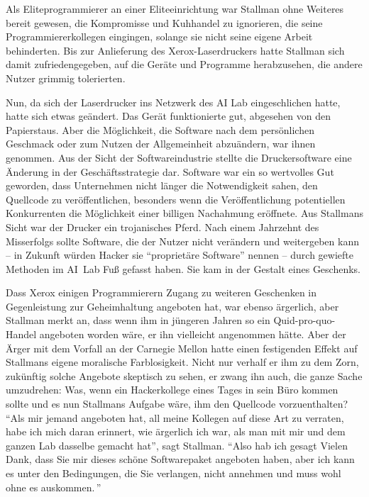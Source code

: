 Als Eliteprogrammierer an einer Eliteeinrichtung war Stallman ohne Weiteres bereit gewesen, die Kompromisse und Kuhhandel zu ignorieren, die seine Programmiererkollegen eingingen, solange sie nicht seine eigene Arbeit behinderten. Bis zur Anlieferung des Xerox-Laserdruckers hatte Stallman sich damit zufriedengegeben, auf die Geräte und Programme herabzusehen, die andere Nutzer grimmig tolerierten.

Nun, da sich der Laserdrucker ins Netzwerk des AI Lab eingeschlichen hatte, hatte sich etwas geändert. Das Gerät funktionierte gut, abgesehen von den Papierstaus. Aber die Möglichkeit, die Software nach dem persönlichen Geschmack oder zum Nutzen der Allgemeinheit abzuändern, war ihnen genommen. Aus der Sicht der Softwareindustrie stellte die Druckersoftware eine Änderung in der Geschäftsstrategie dar. Software war ein so wertvolles Gut geworden, dass Unternehmen nicht länger die Notwendigkeit sahen, den Quellcode zu veröffentlichen, besonders wenn die Veröffentlichung potentiellen Konkurrenten die Möglichkeit einer billigen Nachahmung eröffnete. Aus Stallmans Sicht war der Drucker ein trojanisches Pferd. Nach einem Jahrzehnt des Misserfolgs sollte Software, die der Nutzer nicht verändern und weitergeben kann – in Zukunft würden Hacker sie "`proprietäre Software"' nennen – durch gewiefte Methoden im AI~Lab Fuß gefasst haben. Sie kam in der Gestalt eines Geschenks.

Dass Xerox einigen Programmierern Zugang zu weiteren Geschenken in Gegenleistung zur Geheimhaltung angeboten hat, war ebenso ärgerlich, aber Stallman merkt an, dass wenn ihm in jüngeren Jahren so ein Quid-pro-quo-Handel angeboten worden wäre, er ihn vielleicht angenommen hätte. Aber der Ärger mit dem Vorfall an der Carnegie Mellon hatte einen festigenden Effekt auf Stallmans eigene moralische Farblosigkeit. Nicht nur verhalf er ihm zu dem Zorn, zukünftig solche Angebote skeptisch zu sehen, er zwang ihn auch, die ganze Sache umzudrehen: Was, wenn ein Hackerkollege eines Tages in sein Büro kommen sollte und es nun Stallmans Aufgabe wäre, ihm den Quellcode vorzuenthalten?
"`Als mir jemand angeboten hat, all meine Kollegen auf diese Art zu verraten, habe ich mich daran erinnert, wie ärgerlich ich war, als man mit mir und dem ganzen Lab dasselbe gemacht hat"', sagt Stallman. "`Also hab ich gesagt \glq Vielen Dank, dass Sie mir dieses schöne Softwarepaket angeboten haben, aber ich kann es unter den Bedingungen, die Sie verlangen, nicht annehmen und muss wohl ohne es auskommen.\grq\,"'

